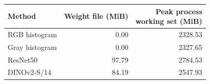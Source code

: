 \begin{tabular}{lrr}
\toprule
Method & Weight file (MiB) & \makecell{Peak process\\working set (MiB)} \\
\midrule
RGB histogram & 0.00 & 2328.53 \\
Gray histogram & 0.00 & 2327.65 \\
ResNet50 & 97.79 & 2784.53 \\
DINOv2-S/14 & 84.19 & 2547.93 \\
\bottomrule
\end{tabular}
